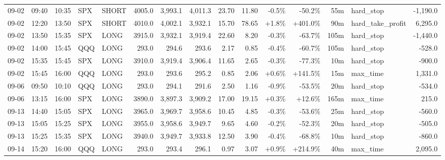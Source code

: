 \documentclass[11pt,a4paper,twoside]{article}
\begin{document}
\begin{landscape}
\begin{center}
\begin{longtable}{>{\color{txtmain}}l l l l l r r r r r r r r >{\color{txtmain}}l r}
09-02 & 09:40 & 10:35 & SPX & SHORT & 4005.0 & 3,993.1 & 4,011.3 & 23.70 & 11.80 & \textcolor{lossred}{-0.5\%} & \textcolor{lossred}{-50.2\%} & 55m & hard\_stop & \textcolor{lossred}{-1,190.0} \\
09-02 & 12:20 & 13:50 & SPX & SHORT & 4010.0 & 4,002.1 & 3,932.1 & 15.70 & 78.65 & \textcolor{wingreen}{+1.8\%} & \textcolor{wingreen}{+401.0\%} & 90m & hard\_take\_profit & \textcolor{wingreen}{6,295.0} \\
09-02 & 13:50 & 15:35 & SPX & LONG & 3915.0 & 3,932.1 & 3,919.4 & 22.60 & 8.20 & \textcolor{lossred}{-0.3\%} & \textcolor{lossred}{-63.7\%} & 105m & hard\_stop & \textcolor{lossred}{-1,440.0} \\
09-02 & 14:00 & 15:45 & QQQ & LONG & 293.0 & 294.6 & 293.6 & 2.17 & 0.85 & \textcolor{lossred}{-0.4\%} & \textcolor{lossred}{-60.7\%} & 105m & hard\_stop & \textcolor{lossred}{-528.0} \\
09-02 & 15:35 & 15:45 & SPX & LONG & 3910.0 & 3,919.4 & 3,906.4 & 11.65 & 2.65 & \textcolor{lossred}{-0.3\%} & \textcolor{lossred}{-77.3\%} & 10m & hard\_stop & \textcolor{lossred}{-900.0} \\
09-02 & 15:45 & 16:00 & QQQ & LONG & 293.0 & 293.6 & 295.2 & 0.85 & 2.06 & \textcolor{wingreen}{+0.6\%} & \textcolor{wingreen}{+141.5\%} & 15m & max\_time & \textcolor{wingreen}{1,331.0} \\
09-06 & 09:50 & 10:10 & QQQ & LONG & 293.0 & 294.1 & 291.6 & 2.50 & 1.16 & \textcolor{lossred}{-0.9\%} & \textcolor{lossred}{-53.5\%} & 20m & hard\_stop & \textcolor{lossred}{-534.0} \\
09-06 & 13:15 & 16:00 & SPX & LONG & 3890.0 & 3,897.3 & 3,909.2 & 17.00 & 19.15 & \textcolor{wingreen}{+0.3\%} & \textcolor{wingreen}{+12.6\%} & 165m & max\_time & \textcolor{wingreen}{215.0} \\
09-13 & 14:40 & 15:05 & SPX & LONG & 3965.0 & 3,969.7 & 3,958.6 & 10.45 & 4.85 & \textcolor{lossred}{-0.3\%} & \textcolor{lossred}{-53.6\%} & 25m & hard\_stop & \textcolor{lossred}{-560.0} \\
09-13 & 15:05 & 15:25 & SPX & LONG & 3955.0 & 3,958.6 & 3,949.7 & 9.65 & 4.60 & \textcolor{lossred}{-0.2\%} & \textcolor{lossred}{-52.3\%} & 20m & hard\_stop & \textcolor{lossred}{-505.0} \\
09-13 & 15:25 & 15:35 & SPX & LONG & 3940.0 & 3,949.7 & 3,933.8 & 12.50 & 3.90 & \textcolor{lossred}{-0.4\%} & \textcolor{lossred}{-68.8\%} & 10m & hard\_stop & \textcolor{lossred}{-860.0} \\
09-14 & 15:20 & 16:00 & QQQ & LONG & 293.0 & 293.4 & 296.1 & 0.97 & 3.07 & \textcolor{wingreen}{+0.9\%} & \textcolor{wingreen}{+214.9\%} & 40m & max\_time & \textcolor{wingreen}{2,095.0} \\

\end{longtable}
\end{center}
\end{landscape}
\end{document}
